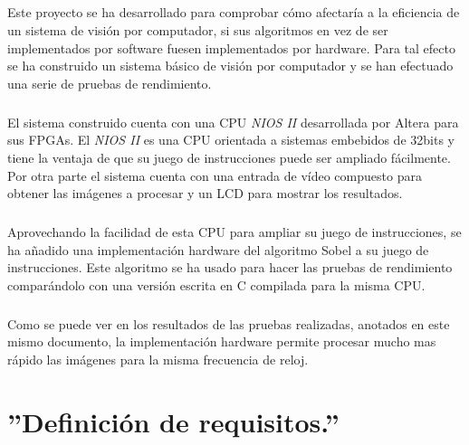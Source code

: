 \documentclass[a4paper,12pt,titlepage,final]{book}
\begin{document}
\paragraph{}
Este proyecto se ha desarrollado para comprobar cómo afectaría a la eficiencia de un sistema de visión por computador, si sus algoritmos en vez de ser implementados por software fuesen implementados por hardware. Para tal efecto se ha construido un sistema básico de visión por computador y se han efectuado una serie de pruebas de rendimiento.

\paragraph{}
El sistema construido cuenta con una CPU \textit{NIOS II} desarrollada por Altera para sus FPGAs. El \textit{NIOS II} es una CPU orientada a sistemas embebidos de 32bits y tiene la ventaja de que su juego de instrucciones puede ser ampliado fácilmente. Por otra parte el sistema cuenta con una entrada de vídeo compuesto para obtener las imágenes a procesar y un LCD para mostrar los resultados.

\paragraph{}
Aprovechando la facilidad de esta CPU para ampliar su juego de instrucciones, se ha añadido una implementación hardware del algoritmo Sobel a su juego de instrucciones. Este algoritmo se ha usado para hacer las pruebas de rendimiento comparándolo con una versión escrita en C compilada para la misma CPU.

\paragraph{}
Como se puede ver en los resultados de las pruebas realizadas, anotados en este mismo documento, la implementación hardware permite procesar mucho mas rápido las imágenes para la misma frecuencia de reloj.

\chapter{''Definición de requisitos.''} 
\label{chap:defreq}

\section*{}
\subsection*{}
\end{document}
